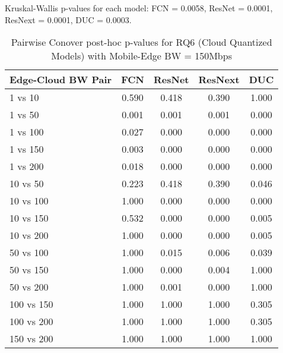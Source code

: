\begin{table}[h]
\centering
\caption{Pairwise Conover post-hoc p-values for RQ6 (Cloud Quantized Models) with Mobile-Edge BW = 150Mbps}
\label{tab:conover_cloud_quantized_me150}
\smallskip
Kruskal-Wallis p-values for each model: FCN = 0.0058, ResNet = 0.0001, ResNext = 0.0001, DUC = 0.0003.

\begin{tabular}{lcccc}
\toprule
Edge-Cloud BW Pair & FCN & ResNet & ResNext & DUC \\
\midrule
1 vs 10 & 0.590 & 0.418 & 0.390 & 1.000 \\
1 vs 50 & 0.001 & 0.001 & 0.001 & 0.000 \\
1 vs 100 & 0.027 & 0.000 & 0.000 & 0.000 \\
1 vs 150 & 0.003 & 0.000 & 0.000 & 0.000 \\
1 vs 200 & 0.018 & 0.000 & 0.000 & 0.000 \\
10 vs 50 & 0.223 & 0.418 & 0.390 & 0.046 \\
10 vs 100 & 1.000 & 0.000 & 0.000 & 0.000 \\
10 vs 150 & 0.532 & 0.000 & 0.000 & 0.005 \\
10 vs 200 & 1.000 & 0.000 & 0.000 & 0.005 \\
50 vs 100 & 1.000 & 0.015 & 0.006 & 0.039 \\
50 vs 150 & 1.000 & 0.000 & 0.004 & 1.000 \\
50 vs 200 & 1.000 & 0.001 & 0.000 & 1.000 \\
100 vs 150 & 1.000 & 1.000 & 1.000 & 0.305 \\
100 vs 200 & 1.000 & 1.000 & 1.000 & 0.305 \\
150 vs 200 & 1.000 & 1.000 & 1.000 & 1.000 \\
\bottomrule
\end{tabular}
\end{table}

